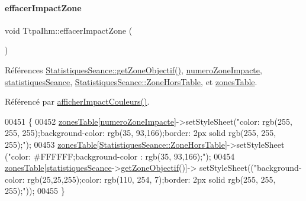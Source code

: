 \paragraph{\texorpdfstring{effacer\+Impact\+Zone}{effacerImpactZone}}
{\footnotesize\ttfamily void Ttpa\+Ihm\+::effacer\+Impact\+Zone (\begin{DoxyParamCaption}{ }\end{DoxyParamCaption})\hspace{0.3cm}{\ttfamily [slot]}}



Références \hyperlink{class_statistiques_seance_a61c01cb1d35cda871e8243658213ee5b}{Statistiques\+Seance\+::get\+Zone\+Objectif()}, \hyperlink{class_ttpa_ihm_af8fa0aee928ee727f27ff605c0c1d991}{numero\+Zone\+Impacte}, \hyperlink{class_ttpa_ihm_abed6897d6f7b4d3a5eb8dcc07651e740}{statistiques\+Seance}, \hyperlink{class_statistiques_seance_aa839f5192cbadd7c3fb3651d62eff8b5aeb6ef225df9153e1f46a968ae71bf2f3}{Statistiques\+Seance\+::\+Zone\+Hors\+Table}, et \hyperlink{class_ttpa_ihm_af77d75f1aa3eb901b9410e5fc465ece8}{zones\+Table}.



Référencé par \hyperlink{class_ttpa_ihm_a6e3cd3828ce5d165497e343bdb15cd87}{afficher\+Impact\+Couleurs()}.


\begin{DoxyCode}
00451 \{
00452     \hyperlink{class_ttpa_ihm_af77d75f1aa3eb901b9410e5fc465ece8}{zonesTable}[\hyperlink{class_ttpa_ihm_af8fa0aee928ee727f27ff605c0c1d991}{numeroZoneImpacte}]->setStyleSheet(\textcolor{stringliteral}{"color: rgb(255, 255,
       255);background-color: rgb(35, 93,166);border: 2px solid rgb(255, 255, 255);"});
00453     \hyperlink{class_ttpa_ihm_af77d75f1aa3eb901b9410e5fc465ece8}{zonesTable}[\hyperlink{class_statistiques_seance_aa839f5192cbadd7c3fb3651d62eff8b5aeb6ef225df9153e1f46a968ae71bf2f3}{StatistiquesSeance::ZoneHorsTable}]->setStyleSheet
      (\textcolor{stringliteral}{"color: #FFFFFF;background-color : rgb(35, 93,166);"});
00454     \hyperlink{class_ttpa_ihm_af77d75f1aa3eb901b9410e5fc465ece8}{zonesTable}[\hyperlink{class_ttpa_ihm_abed6897d6f7b4d3a5eb8dcc07651e740}{statistiquesSeance}->\hyperlink{class_statistiques_seance_a61c01cb1d35cda871e8243658213ee5b}{getZoneObjectif}()]->
      setStyleSheet((\textcolor{stringliteral}{"background-color: rgb(25,25,255);color: rgb(110, 254, 7);border: 2px solid rgb(255, 255, 255);"}));
00455 \}
\end{DoxyCode}
\mbox{\label{class_ttpa_ihm_a3a2380e2259f7b5bb1fd4d2ae470e06d}} 

